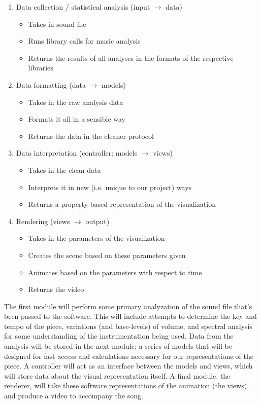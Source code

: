\documentclass{article}
\begin{document}
\begin{enumerate}
	\item Data collection / statistical analysis (input $\rightarrow$ data)
	\begin{itemize}
		\item Takes in sound file
		\item Runs library calls for music analysis
		\item Returns the results of all analyses in the formats of the respective libraries
	\end{itemize}
	\item Data formatting (data $\rightarrow$ models)
	\begin{itemize}
		\item Takes in the raw analysis data
		\item Formats it all in a sensible way
		\item Returns the data in the cleaner protocol
	\end{itemize}
	\item Data interpretation (controller: models $\rightarrow$ views)
	\begin{itemize}
		\item Takes in the clean data
		\item Interprets it in new (i.e. unique to our project) ways
		\item Returns a property-based representation of the visualization
	\end{itemize}
	\item Rendering (views $\rightarrow$ output)
	\begin{itemize}
		\item Takes in the parameters of the visualization
		\item Creates the scene based on these parameters given
		\item Animates based on the parameters with respect to time
		\item Returns the video
	\end{itemize}
\end{enumerate}

The first module will perform some primary analyzation of the sound file that's been passed to the software. This will include attempts to determine the key and tempo of the piece, variations (and base-levels) of volume, and spectral analysis for some understanding of the instrumentation being used. Data from the analysis will be stored in the next module; a series of models that will be designed for fast access and calculations necessary for our representations of the piece.
	A controller will act as an interface between the models and views, which will store data about the visual representation itself. A final module, the renderer, will take these software representations of the animation (the views), and produce a video to accompany the song.
\end{document}
